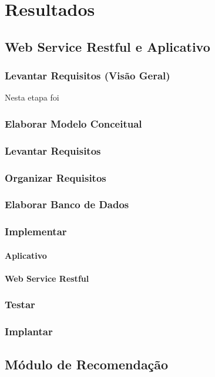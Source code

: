 \chapter{\textbf{Resultados}} %
\sloppy %

\section{Web Service Restful e Aplicativo}

\subsection{Levantar Requisitos (Visão Geral)}
Nesta etapa foi 

\subsection{Elaborar Modelo Conceitual}

\subsection{Levantar Requisitos}

\subsection{Organizar Requisitos}

\subsection{Elaborar Banco de Dados}

\subsection{Implementar}

\subsubsection{Aplicativo}

\subsubsection{Web Service Restful}

\subsection{Testar}

\subsection{Implantar}

\section{Módulo de Recomendação}
